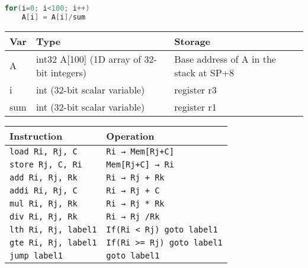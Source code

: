 \documentclass[docid=2020]{comp_test2}
\begin{document}
\renewcommand\thesubsubsection{\thesubsection.\arabic{subsubsection}}
\setcounter{chapter}{2020}


\begin{lstlisting}[language=c++, caption=Code1]
for(i=0; i<100; i++)
    A[i] = A[i]/sum
\end{lstlisting}

\noindent
\begin{minipage}[t]{0.45\textwidth}
    \begin{center}
        \begin{tabular}{| l | p{28mm} | p{24mm} |}
            \hline
            \textbf{Var} & \textbf{Type} & \textbf{Storage} \\ \hline
            A & int32 A[100] (1D array of 32-bit integers) & Base address of A in the stack at SP+8 \\ \hline
            i & int (32-bit scalar variable) & register r3 \\ \hline
            sum & int (32-bit scalar variable) & register r1 \\ \hline
        \end{tabular}
    \end{center}
\end{minipage}
\begin{minipage}[t]{0.539\textwidth}
    \small
    \begin{center}
        \begin{tabular}{| l | l |}
            \hline
            \textbf{Instruction} & \textbf{Operation} \\ \hline
            \texttt{load Ri, Rj, C    } & \texttt{Ri → Mem[Rj+C]          } \\ \hline
            \texttt{store Rj, C, Ri   } & \texttt{Mem[Rj+C] → Ri          } \\ \hline
            \texttt{add Ri, Rj, Rk    } & \texttt{Ri → Rj + Rk            } \\ \hline
            \texttt{addi Ri, Rj, C    } & \texttt{Ri → Rj + C             } \\ \hline
            \texttt{mul Ri, Rj, Rk    } & \texttt{Ri → Rj * Rk            } \\ \hline
            \texttt{div Ri, Rj, Rk    } & \texttt{Ri → Rj /Rk             } \\ \hline
            \texttt{lth Ri, Rj, label1} & \texttt{If(Ri < Rj) goto label1 } \\ \hline
            \texttt{gte Ri, Rj, label1} & \texttt{If(Ri >= Rj) goto label1} \\ \hline
            \texttt{jump label1       } & \texttt{goto label1             } \\ \hline
        \end{tabular}
    \end{center}
\end{minipage}
\end{document}
